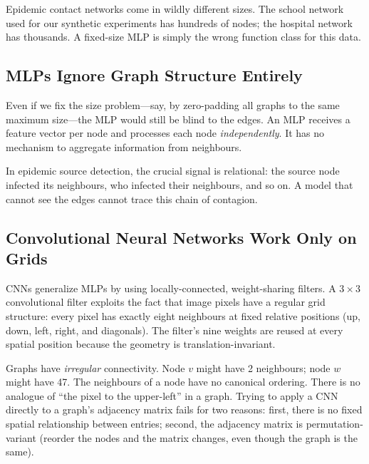 Epidemic contact networks come in wildly different sizes. The school network used for our synthetic experiments has hundreds of nodes; the hospital network has thousands. A fixed-size MLP is simply the wrong function class for this data.

\subsection{MLPs Ignore Graph Structure Entirely}

Even if we fix the size problem---say, by zero-padding all graphs to the same maximum size---the MLP would still be blind to the edges. An MLP receives a feature vector per node and processes each node \emph{independently}. It has no mechanism to aggregate information from neighbours.

In epidemic source detection, the crucial signal is relational: the source node infected its neighbours, who infected their neighbours, and so on. A model that cannot see the edges cannot trace this chain of contagion.

\subsection{Convolutional Neural Networks Work Only on Grids}

CNNs generalize MLPs by using locally-connected, weight-sharing filters. A $3 \times 3$ convolutional filter exploits the fact that image pixels have a regular grid structure: every pixel has exactly eight neighbours at fixed relative positions (up, down, left, right, and diagonals). The filter's nine weights are reused at every spatial position because the geometry is translation-invariant.

Graphs have \emph{irregular} connectivity. Node $v$ might have 2 neighbours; node $w$ might have 47. The neighbours of a node have no canonical ordering. There is no analogue of ``the pixel to the upper-left'' in a graph. Trying to apply a CNN directly to a graph's adjacency matrix fails for two reasons: first, there is no fixed spatial relationship between entries; second, the adjacency matrix is permutation-variant (reorder the nodes and the matrix changes, even though the graph is the same).

